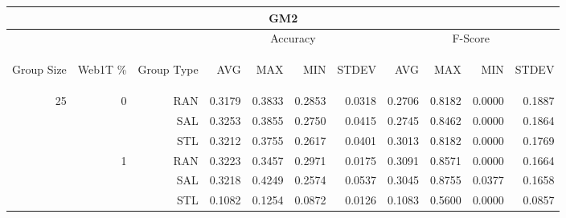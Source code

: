 \begin{center}
\begin{table}[htbp] 
 \begin{center}
\begin{tabular}{ | r | r | r | r | r | r | r | r | r | r | r |}
\hline
\multicolumn{11}{|c|}{GM2}\\
\hline
 & & & \multicolumn{4}{|c|}{Accuracy} & \multicolumn{4}{|c|}{F-Score}\\ \cline{4-11}
\begin{sideways}Group Size\end{sideways} & \begin{sideways}Web1T \%\end{sideways} & \begin{sideways}Group Type\end{sideways} & \begin{sideways}AVG\end{sideways} & \begin{sideways}MAX\end{sideways} & \begin{sideways}MIN\end{sideways} & \begin{sideways}STDEV\end{sideways} & \begin{sideways}AVG\end{sideways} & \begin{sideways}MAX\end{sideways} & \begin{sideways}MIN\end{sideways} & \begin{sideways}STDEV\end{sideways}\\
\hline
\multirow{18}{*}{25}
 & \multirow{3}{*}{0} & RAN & 0.3179 & 0.3833 & 0.2853 & 0.0318 & 0.2706 & 0.8182 & 0.0000 & 0.1887\\ \cline{3-11}
 &   & SAL & 0.3253 & 0.3855 & 0.2750 & 0.0415 & 0.2745 & 0.8462 & 0.0000 & 0.1864\\ \cline{3-11}
 &   & STL & 0.3212 & 0.3755 & 0.2617 & 0.0401 & 0.3013 & 0.8182 & 0.0000 & 0.1769\\ \cline{2-11}
 & \multirow{3}{*}{1} & RAN & 0.3223 & 0.3457 & 0.2971 & 0.0175 & 0.3091 & 0.8571 & 0.0000 & 0.1664\\ \cline{3-11}
 &   & SAL & 0.3218 & 0.4249 & 0.2574 & 0.0537 & 0.3045 & 0.8755 & 0.0377 & 0.1658\\ \cline{3-11}
 &   & STL & 0.1082 & 0.1254 & 0.0872 & 0.0126 & 0.1083 & 0.5600 & 0.0000 & 0.0857\\ \cline{2-11}

\end{tabular}
\end{center}
\end{table}
\end{center}
